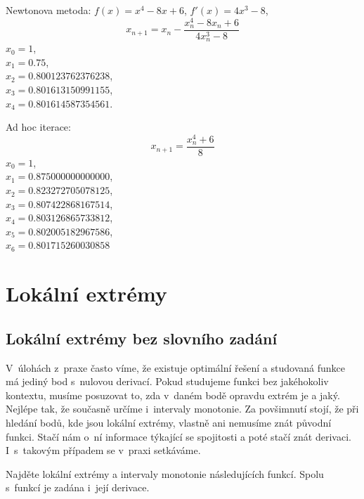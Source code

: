 \reseni

Newtonova metoda: $f(x)=x^4-8x+6$, $f'(x)=4x^3-8$, $$x_{n+1}=x_n-\frac{x_n^4-8x_n+6}{4x_n^3-8}$$
$x_0=1$,\\ $x_1=0.75$,\\ $x_2=0.800123762376238$,\\ $x_3=0.801613150991155$,\\ $x_4=0.801614587354561$.

Ad hoc iterace: $$x_{n+1}=\frac{x_n^4+6}{8}$$
$x_0=1$,\\ $x_1=0.875000000000000$,\\ $x_2=0.823272705078125$,\\ $x_3=0.807422868167514$,\\ $x_4=0.803126865733812$,\\ $x_5=0.802005182967586$,\\ $x_6=0.801715260030858$

\konec

\stranka
\section{Lokální extrémy}

\stranka
\subsection{Lokální extrémy bez slovního zadání} V úlohách z praxe často
víme, že existuje optimální řešení a studovaná funkce má jediný bod s nulovou derivací. Pokud studujeme funkci bez jakéhokoliv kontextu,
musíme posuzovat to, zda v daném bodě opravdu extrém je a
jaký. Nejlépe tak, že současně určíme i intervaly monotonie. Za
povšimnutí stojí, že při hledání bodů, kde jsou lokální extrémy,
vlastně ani nemusíme znát původní funkci. Stačí nám o ní informace
týkající se spojitosti a poté stačí znát derivaci. I~s~takovým
případem se v praxi setkáváme.


Najděte lokální extrémy a intervaly monotonie následujících funkcí. Spolu s funkcí je zadána i její derivace.


